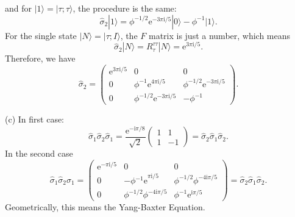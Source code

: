 \documentclass{book}
\begin{document}
and for $|1 \rangle =|\tau ;\tau \rangle $, the procedure is the same:
\begin{equation*}
\hat{\sigma }_{2} |1\rangle =\phi ^{-1/2}\mathrm{e}^{-3\pi \mathrm{i} /5} |0 \rangle -\phi ^{-1} |1 \rangle .
\end{equation*}
For the single state $|N \rangle =|\tau ;I \rangle $, the $F$ matrix is just a number, which means
\begin{equation*}
\hat{\sigma }_{2} |N\rangle =R_{\tau }^{\tau \tau } |N\rangle =\mathrm{e}^{3\pi \mathrm{i} /5} .
\end{equation*}
Therefore, we have
\begin{equation*}
\hat{\sigma }_{2} =\begin{pmatrix}
\mathrm{e}^{3\pi \mathrm{i} /5} & 0 & 0\\
0 & \phi ^{-1}\mathrm{e}^{4\pi \mathrm{i} /5} & \phi ^{-1/2}\mathrm{e}^{-3\pi \mathrm{i} /5}\\
0 & \phi ^{-1/2}\mathrm{e}^{-3\pi \mathrm{i} /5} & -\phi ^{-1}
\end{pmatrix} .
\end{equation*}


(c) In first case:
\begin{equation*}
\hat{\sigma }_{1}\hat{\sigma }_{2}\hat{\sigma }_{1} =\frac{\mathrm{e}^{-\mathrm{i} \pi /8}}{\sqrt{2}}\begin{pmatrix}
1 & 1\\
1 & -1
\end{pmatrix} =\hat{\sigma }_{2}\hat{\sigma }_{1}\hat{\sigma }_{2} .
\end{equation*}
In the second case
\begin{equation*}
\hat{\sigma }_{1}\hat{\sigma }_{2}\hat{\sigma }_{1} =\begin{pmatrix}
\mathrm{e}^{-\pi \mathrm{i} /5} & 0 & 0\\
0 & -\phi \mathrm{^{-1} e}^{\pi \mathrm{i} /5} & \phi ^{-1/2} \phi ^{-4\mathrm{i} \pi /5}\\
0 & \phi ^{-1/2} \phi ^{-4\mathrm{i} \pi /5} & \phi ^{-1}\mathrm{e}^{\mathrm{i} \pi /5}
\end{pmatrix} =\hat{\sigma }_{2}\hat{\sigma }_{1}\hat{\sigma }_{2} .
\end{equation*}
Geometrically, this means the Yang-Baxter Equation.
\end{document}
